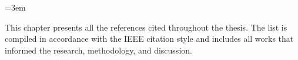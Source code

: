 
\begingroup
{} %
\emergencystretch=3em %

This chapter presents all the references cited throughout the thesis. 
The list is compiled in accordance with the IEEE citation style and 
includes all works that informed the research, methodology, and discussion. 

\raggedright
\printbib

\endgroup

